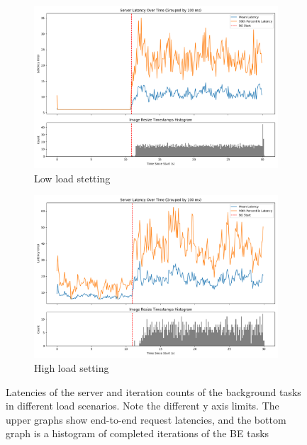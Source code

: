 \begin{figure}[t]
    \centering
    \begin{subfigure}[t]{0.48\textwidth}
        \includegraphics[width=\textwidth]{graphs/unedited-weight-low-two.png}
        \caption{Low load stetting}\label{fig:unedited-weight-low-two}
    \end{subfigure}
    \hspace{\fill}
    \begin{subfigure}[t]{0.48\textwidth}
        \includegraphics[width=\textwidth]{graphs/unedited-weight-high-two.png}
        \caption{High load setting}\label{fig:unedited-weight-high-two}
    \end{subfigure}
    \caption{Latencies of the server and iteration counts of the background
    tasks in different load scenarios. Note the different y axis limits. The
    upper graphs show end-to-end request latencies, and the bottom graph is a
    histogram of completed iterations of the BE tasks}
\end{figure}

